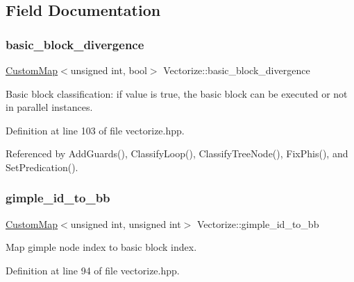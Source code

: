\subsection{Field Documentation}
\mbox{\label{classVectorize_a9cb02388e4050f92e61fe5d2b8849acf}} 
\subsubsection{\texorpdfstring{basic\+\_\+block\+\_\+divergence}{basic\_block\_divergence}}
{\footnotesize\ttfamily \hyperlink{custom__map_8hpp_a18ca01763abbe3e5623223bfe5aaac6b}{Custom\+Map}$<$unsigned int, bool$>$ Vectorize\+::basic\+\_\+block\+\_\+divergence\hspace{0.3cm}{\ttfamily [private]}}



Basic block classification\+: if value is true, the basic block can be executed or not in parallel instances. 



Definition at line 103 of file vectorize.\+hpp.



Referenced by Add\+Guards(), Classify\+Loop(), Classify\+Tree\+Node(), Fix\+Phis(), and Set\+Predication().

\mbox{\label{classVectorize_a44e94b6872650e5a3d7af8e248a01d14}} 
\subsubsection{\texorpdfstring{gimple\+\_\+id\+\_\+to\+\_\+bb}{gimple\_id\_to\_bb}}
{\footnotesize\ttfamily \hyperlink{custom__map_8hpp_a18ca01763abbe3e5623223bfe5aaac6b}{Custom\+Map}$<$unsigned int, unsigned int$>$ Vectorize\+::gimple\+\_\+id\+\_\+to\+\_\+bb\hspace{0.3cm}{\ttfamily [private]}}



Map gimple node index to basic block index. 



Definition at line 94 of file vectorize.\+hpp.

